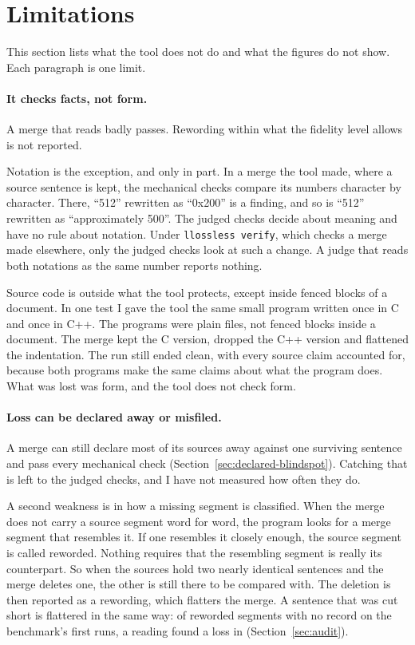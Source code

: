 \section{Limitations}
\label{sec:limitations}

This section lists what the tool does not do and what the figures do not show. Each paragraph is one limit.

\paragraph{It checks facts, not form.} A merge that reads badly passes. Rewording within what the fidelity level allows is not reported.

Notation is the exception, and only in part. In a merge the tool made, where a source sentence is kept, the mechanical checks compare its numbers character by character. There, ``512'' rewritten as ``0x200'' is a finding, and so is ``512'' rewritten as ``approximately 500''. The judged checks decide about meaning and have no rule about notation. Under \texttt{llossless verify}, which checks a merge made elsewhere, only the judged checks look at such a change. A judge that reads both notations as the same number reports nothing.

Source code is outside what the tool protects, except inside fenced blocks of a document. In one test I gave the tool the same small program written once in C and once in C++. The programs were plain files, not fenced blocks inside a document. The merge kept the C version, dropped the C++ version and flattened the indentation. The run still ended clean, with every source claim accounted for, because both programs make the same claims about what the program does. What was lost was form, and the tool does not check form.

\paragraph{Loss can be declared away or misfiled.} A merge can still declare most of its sources away against one surviving sentence and pass every mechanical check (Section~\ref{sec:declared-blindspot}). Catching that is left to the judged checks, and I have not measured how often they do.

A second weakness is in how a missing segment is classified. When the merge does not carry a source segment word for word, the program looks for a merge segment that resembles it. If one resembles it closely enough, the source segment is called reworded. Nothing requires that the resembling segment is really its counterpart. So when the sources hold two nearly identical sentences and the merge deletes one, the other is still there to be compared with. The deletion is then reported as a rewording, which flatters the merge. A sentence that was cut short is flattered in the same way: of  reworded segments with no record on the benchmark's first runs, a reading found a loss in  (Section~\ref{sec:audit}).

